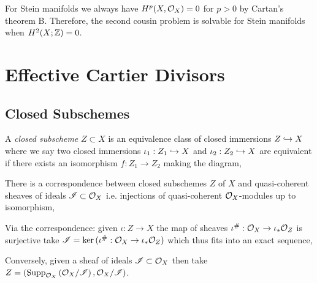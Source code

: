 \documentclass[12pt]{article}
\begin{document}
\begin{rmk}
For Stein manifolds we always have $H^p(X, \mathcal{O}_{X}) = 0$ for $p > 0$ by Cartan's theorem B. Therefore, the second cousin problem is solvable for Stein manifolds when $H^2(X; \mathbb{Z}) = 0$. 
\end{rmk}


\section{Effective Cartier Divisors}

\subsection{Closed Subschemes}

\begin{defn}
A \textit{closed subscheme} $Z \subset X$ is an equivalence class of closed immersions $Z \hookrightarrow X$ where we say two closed immersions $\iota_1 : Z_1 \hookrightarrow X$ and $\iota_2 : Z_2 \hookrightarrow X$ are equivalent if there exists an isomorphism $f : Z_1 \to Z_2$ making the diagram,
\begin{center}
\end{center}
\end{defn}


\begin{theorem}
There is a correspondence between closed subschemes $Z$ of $X$ and quasi-coherent sheaves of ideals $\mathscr{I} \subset \mathcal{O}_{X}$ i.e. injections of quasi-coherent $\mathcal{O}_{X}$-modules up to isomorphism,
\begin{center}
\end{center}
Via the correspondence: given $\iota : Z \to X$ the map of sheaves $\iota^\# : \mathcal{O}_{X} \to \iota_* \mathcal{O}_{Z}$ is surjective take $\mathscr{I} = \ker{(\iota^\# : \mathcal{O}_{X} \to \iota_* \mathcal{O}_{Z})}$ which thus fits into an exact sequence,
\begin{center}
\end{center}
Conversely, given a sheaf of ideals $\mathscr{I} \subset \mathcal{O}_{X}$ then take $Z = (\mathrm{Supp}_{\mathcal{O}_{X}}\left(\mathcal{O}_{X} / \mathscr{I} \right), \mathcal{O}_{X} / \mathscr{I})$.
\end{theorem}
\end{document}
